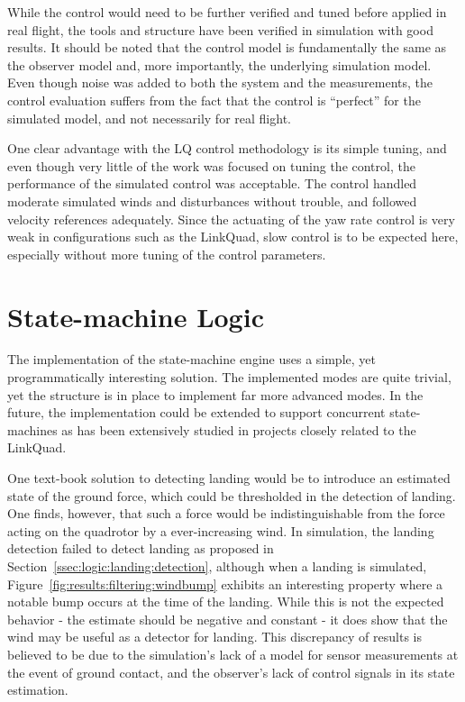         While the control would need to be further verified and tuned before applied in real flight,
        the tools and structure have been verified in simulation with good results.
        It should be noted that the control model is fundamentally the same
        as the observer model and, more importantly, the underlying simulation
        model. Even though noise was added to both the system and the measurements,
        the control evaluation suffers from the fact that the control is ``perfect'' for the
        simulated model, and not necessarily for real flight.

        One clear advantage with the LQ control methodology is its simple
        tuning, and even though very little of the work was focused on
        tuning the control, the performance of the simulated control was acceptable.
        The control handled moderate simulated winds and disturbances without trouble, and
        followed velocity references adequately.
        Since the actuating of the yaw rate control is very weak in
        configurations such as the LinkQuad, slow control
        is to be expected here, especially without more tuning of the control
        parameters.

    \section{State-machine Logic}
        The implementation of the state-machine engine uses a simple, yet
        programmatically interesting solution. The implemented modes
        are quite trivial, yet the structure is in place to implement
        far more advanced modes. In the future, the implementation could
        be extended to support concurrent state-machines as has been
        extensively studied in projects closely related to the LinkQuad.

        One text-book solution to detecting landing would be to introduce
        an estimated state of the ground force, which could be thresholded
        in the detection of landing. One finds, however,
        that such a force would be indistinguishable from
        the force acting on the quadrotor by a ever-increasing wind.
        In simulation, the landing detection failed to detect landing
        as proposed in Section~\ref{ssec:logic:landing:detection}, although
        when a landing is simulated, Figure~\ref{fig:results:filtering:windbump}
        exhibits an interesting property where a notable bump occurs at the
        time of the landing. While this is not the expected behavior
        - the estimate should be negative and constant -
        it does show that the wind may be useful as a detector for landing.
        This discrepancy of results is believed to be due to
        the simulation's lack of a model for sensor measurements at the event of ground contact,
        and the observer's lack of control signals in its state estimation.

